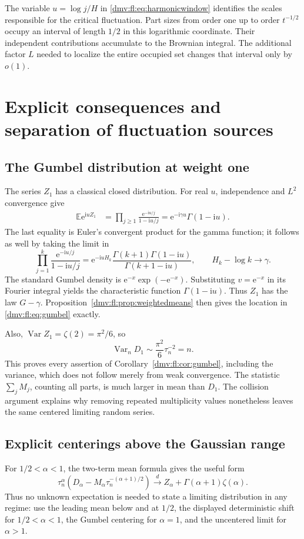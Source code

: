 \documentclass[11pt,letterpaper]{article}
\numberwithin{equation}{section}
\theoremstyle{definition}\newtheorem{definition}[theorem]{Definition}
\theoremstyle{remark}\newtheorem{remark}[theorem]{Remark}
\newcommand{\E}{\mathbb E}
\newcommand{\ii}{\mathrm i}
\newcommand{\ee}{\mathrm e}
\newcommand{\dto}{\xrightarrow{\ d\ }}
\DeclareMathOperator{\Var}{Var}
\begin{document}
The variable $u=\log j/H$ in \eqref{dmv:fl:eq:harmonicwindow} identifies the
scales responsible for the critical fluctuation. Part sizes from order
one up to order $t^{-1/2}$ occupy an interval of length $1/2$ in this
logarithmic coordinate. Their independent contributions accumulate to
the Brownian integral. The additional factor $L$ needed to localize
the entire occupied set changes that interval only by $o(1)$.
\section{Explicit consequences and separation of fluctuation sources}\label{dmv:fl:sec:consequences}

\subsection{The Gumbel distribution at weight one}
The series $Z_1$ has a classical closed distribution. For real $u$,
independence and $L^2$ convergence give
\begin{align}\label{dmv:fl:eq:gumbelproduct}
 \E\ee^{\ii uZ_1}
 &=\prod_{j\ge1}\frac{\ee^{-\ii u/j}}{1-\ii u/j}
 =\ee^{-\ii\gamma u}\Gamma(1-\ii u).
\end{align}
The last equality is Euler's convergent product for the gamma function;
it follows as well by taking the limit in
\[
 \prod_{j=1}^k\frac{\ee^{-\ii u/j}}{1-\ii u/j}
 =\ee^{-\ii uH_k}
   \frac{\Gamma(k+1)\Gamma(1-\ii u)}{\Gamma(k+1-\ii u)},
 \qquad H_k-\log k\longrightarrow\gamma.
\]
The standard Gumbel density is
$\ee^{-x}\exp(-\ee^{-x})$. Substituting $v=\ee^{-x}$ in its Fourier
integral yields the characteristic function $\Gamma(1-\ii u)$.
Thus $Z_1$ has the law $G-\gamma$. Proposition~\ref{dmv:fl:prop:weightedmeans}
then gives the location in \eqref{dmv:fl:eq:gumbel} exactly.

Also, $\Var Z_1=\zeta(2)=\pi^2/6$, so
\[
 \Var_nD_1\sim\frac{\pi^2}{6}\tau_n^{-2}=n.
\]
This proves every assertion of Corollary~\ref{dmv:fl:cor:gumbel}, including
the variance, which does not follow merely from weak convergence.
The statistic $\sum_jM_j$, counting all parts, is much larger in mean
than $D_1$. The collision argument explains why removing repeated
multiplicity values nonetheless leaves the same centered limiting
random series.

\subsection{Explicit centerings above the Gaussian range}
For $1/2<\alpha<1$, the two-term mean formula gives the useful form
\begin{equation}\label{dmv:fl:eq:explicitintermediate}
 \tau_n^\alpha
 \left(D_\alpha-M_\alpha\tau_n^{-(\alpha+1)/2}\right)
 \dto Z_\alpha+\Gamma(\alpha+1)\zeta(\alpha).
\end{equation}
Thus no unknown expectation is needed to state a limiting distribution
in any regime: use the leading mean below and at $1/2$, the displayed
deterministic shift for $1/2<\alpha<1$, the Gumbel centering for
$\alpha=1$, and the uncentered limit for $\alpha>1$.
\end{document}
